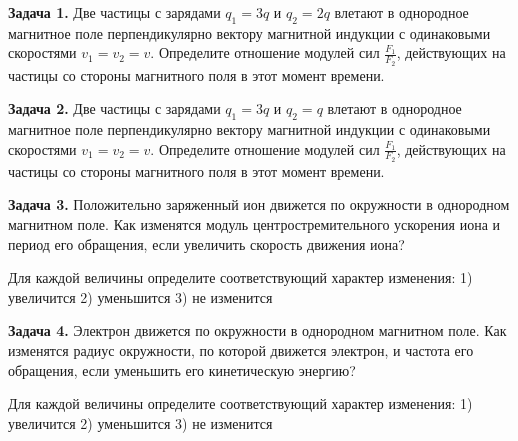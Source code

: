
\begin{taskbasic}[code={\label{task:elem_mag_v23_n12}}]
\textbf{Задача 1.} Две частицы с зарядами $q_1 = 3q$ и $q_2 = 2q$ влетают в однородное магнитное поле перпендикулярно вектору магнитной индукции с одинаковыми скоростями $v_1 = v_2 = v$. Определите отношение модулей сил $\frac{F_1}{F_2}$, действующих на частицы со стороны магнитного поля в этот момент времени.

\end{taskbasic}

\begin{taskbasic}[code={\label{task:elem_mag_v24_n12}}]
\textbf{Задача 2.} Две частицы с зарядами $q_1 = 3q$ и $q_2 = q$ влетают в однородное магнитное поле перпендикулярно вектору магнитной индукции с одинаковыми скоростями $v_1 = v_2 = v$. Определите отношение модулей сил $\frac{F_1}{F_2}$, действующих на частицы со стороны магнитного поля в этот момент времени.

\end{taskbasic}

\begin{taskbasic}[code={\label{task:elem_mag_v27_n15}}]
\textbf{Задача 3.} Положительно заряженный ион движется по окружности в однородном магнитном поле. Как изменятся модуль центростремительного ускорения иона и период его обращения, если увеличить скорость движения иона?

Для каждой величины определите соответствующий характер изменения:
1) увеличится
2) уменьшится
3) не изменится

\end{taskbasic}

\begin{taskbasic}[code={\label{task:elem_mag_v28_n15}}]
\textbf{Задача 4.} Электрон движется по окружности в однородном магнитном поле. Как изменятся радиус окружности, по которой движется электрон, и частота его обращения, если уменьшить его кинетическую энергию?

Для каждой величины определите соответствующий характер изменения:
1) увеличится
2) уменьшится
3) не изменится

\end{taskbasic}

